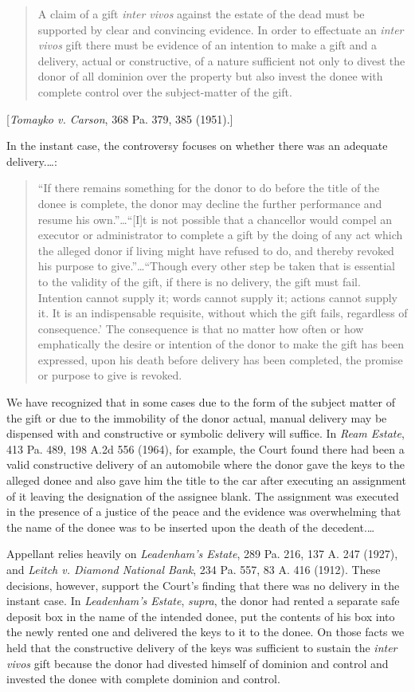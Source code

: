 \begin{quote}
A claim of a gift \textit{inter vivos} against the estate of the dead must be
supported by clear and convincing evidence. In order to effectuate an
\textit{inter vivos} gift there must be evidence of an intention to make a gift
and a delivery, actual or constructive, of a nature sufficient not only to
divest the donor of all dominion over the property but also invest the donee
with complete control over the subject-matter of the gift.
\end{quote}
[\emph{Tomayko v. Carson}, 368 Pa. 379, 385 (1951).]

In the instant case, the controversy focuses on whether there was an adequate
delivery.\dots :
\begin{quote}
``If there remains something for the donor to do before the title of the
donee is complete, the donor may decline the further performance and resume his
own.''\dots ``[I]t is not possible that a chancellor would compel an executor
or administrator to complete a gift by the doing of any act which the alleged
donor if living might have refused to  do, and thereby revoked his purpose to
give.''\dots ``Though every other step be taken that is essential to the
validity of the gift, if there is no delivery, the gift must fail. Intention
cannot supply it; words cannot supply it; actions cannot supply it. It is an
indispensable requisite, without which the gift fails, regardless of
consequence.' The consequence is that no matter how often or how emphatically
the desire or intention of the donor to make the gift has been expressed, upon
his death before delivery has been completed, the promise or purpose to give is
revoked. 
\end{quote}

We have recognized that in some cases due to the form of the subject matter of
the gift or due to the immobility of the donor actual, manual delivery may be
dispensed with and constructive or symbolic delivery will suffice. In \emph{Ream
Estate}, 413 Pa. 489, 198 A.2d 556 (1964), for example, the Court found there
had been a valid constructive delivery of an automobile where the donor gave
the keys to the alleged donee and also gave him the title to the car after
executing an assignment of it leaving the designation of the assignee blank.
The assignment was executed in the presence of a justice of the peace and the
evidence was overwhelming that the name of the donee was to be inserted upon
the death of the decedent.\dots

Appellant relies heavily on \emph{Leadenham's Estate}, 289 Pa. 216, 137 A. 247 (1927),
and \emph{Leitch v. Diamond National Bank}, 234 Pa. 557, 83 A. 416 (1912). These
decisions, however, support the Court's finding that there was no delivery in
the instant case. In \emph{Leadenham's Estate}, \emph{supra}, the donor had
rented a separate
safe deposit box in the name of the intended donee, put the contents of his box
into the newly rented one and delivered the keys to it to the donee. On those
facts we held that the constructive delivery of the keys was sufficient to
sustain the \textit{inter vivos} gift because the donor had divested himself of
dominion and control and invested the donee with complete dominion and control.

